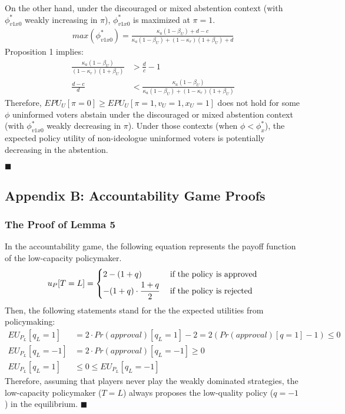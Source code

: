 \par On the other hand, under the discouraged or mixed abstention context (with $\phi^*_{v1x0}$ weakly increasing in $\pi$), $\phi^*_{v1x0}$ is maximized at $\pi=1$.
\begin{align*}
max(\phi^*_{v1x0}) = \frac{\kappa_a(1-\beta_U)+d-c}{\kappa_a(1-\beta_U)+(1-\kappa_r)(1+\beta_U)+d}
\end{align*}
\noindent Proposition 1 implies:
\begin{align*}
\frac{\kappa_a(1-\beta_U)}{(1-\kappa_r)(1+\beta_U)} &> \frac{d}{c} - 1 \\
\frac{d-c}{d} &< \frac{\kappa_a(1-\beta_U)}{\kappa_a(1-\beta_U)+(1-\kappa_r)(1+\beta_U)}
\end{align*}
\noindent Therefore, $EPU_U[\pi=0] \geq EPU_U[\pi=1,v_U=1,x_U=1]$ does not hold for some $\phi$ uninformed voters abstain under the discouraged or mixed abstention context (with $\phi^*_{v1x0}$ weakly decreasing in $\pi$). Under those contexts (when $\phi < \phi^*_x$), the expected policy utility of non-ideologue uninformed voters is potentially decreasing in the abstention.

\hfill $\blacksquare$

\subsection{Appendix B: Accountability Game Proofs}

\subsubsection{The Proof of Lemma 5}

\par In the accountability game, the following equation represents the payoff function of the low-capacity policymaker.
\begin{align*}
u_P[T=L] = \begin{cases}
2 - (1+q) &\text{ if the policy is approved} \\
- (1+q) \cdot \cfrac{1+q}{2} &\text{ if the policy is rejected} \\
\end{cases}
\end{align*}
Then, the following statements stand for the the expected utilities from policymaking:
\begin{align*}
EU_{P_L}[q_L=1] &= 2 \cdot Pr(approval)[q_L=1]  - 2 = 2 (Pr(approval)[q=1]-1) \leq 0\\
EU_{P_L}[q_L=-1] &= 2 \cdot Pr(approval)[q_L=-1] \geq 0 \\
EU_{P_L}[q_L=1] &\leq 0 \leq EU_{P_L}[q_L=-1]
\end{align*}
\noindent Therefore, assuming that players never play the weakly dominated strategies, the low-capacity policymaker ($T=L$) always proposes the low-quality policy ($q=-1$) in the equilibrium. 
\hfill $\blacksquare$

